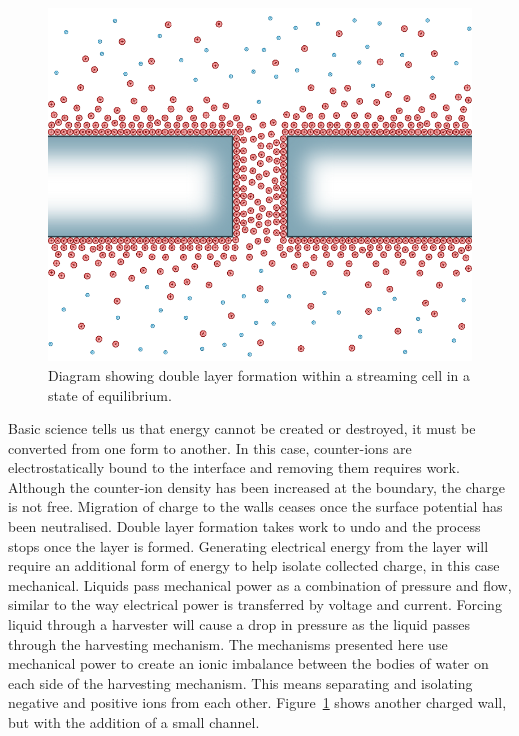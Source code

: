   \begin{figure}[t]
      \centering
      \includegraphics{content/pt1/01-PowerHarvesting/graphics/intro_2_channel_relaxed}
      \caption{
        \label{fig:doubleLayerInChannel_noPressure}
        Diagram showing double layer formation within a streaming cell in a state of equilibrium.
      }
  \end{figure}
  Basic science tells us that energy cannot be created or destroyed, it must be converted from one form to another.
  In this case, counter-ions are electrostatically bound to the interface and removing them requires work.
  Although the counter-ion density has been increased at the boundary, the charge is not free.
  Migration of charge to the walls ceases once the surface potential has been neutralised.
  Double layer formation takes work to undo and the process stops once the layer is formed.
  Generating electrical energy from the layer will require an additional form of energy to help isolate collected charge, in this case mechanical.
  Liquids pass mechanical power as a combination of pressure and flow, similar to the way electrical power is transferred by voltage and current.
  Forcing liquid through a harvester will cause a drop in pressure as the liquid passes through the harvesting mechanism.
  The mechanisms presented here use mechanical power to create an ionic imbalance between the bodies of water on each side of the harvesting mechanism.
  This means separating and isolating negative and positive ions from each other.
  Figure~\ref{fig:doubleLayerInChannel_noPressure} shows another charged wall, but with the addition of a small channel.
